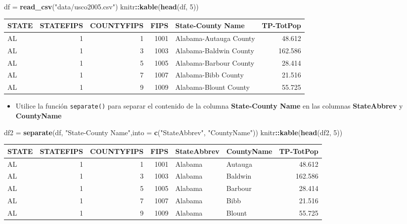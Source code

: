 \documentclass[
]{book}
\newenvironment{Shaded}{\begin{snugshade}}{\end{snugshade}}
\newcommand{\AttributeTok}[1]{\textcolor[rgb]{0.13,0.29,0.53}{#1}}
\newcommand{\DecValTok}[1]{\textcolor[rgb]{0.00,0.00,0.81}{#1}}
\newcommand{\FunctionTok}[1]{\textcolor[rgb]{0.13,0.29,0.53}{\textbf{#1}}}
\newcommand{\NormalTok}[1]{#1}
\newcommand{\OtherTok}[1]{\textcolor[rgb]{0.56,0.35,0.01}{#1}}
\newcommand{\SpecialCharTok}[1]{\textcolor[rgb]{0.81,0.36,0.00}{\textbf{#1}}}
\newcommand{\StringTok}[1]{\textcolor[rgb]{0.31,0.60,0.02}{#1}}
\providecommand{\tightlist}{%
  \setlength{\itemsep}{0pt}\setlength{\parskip}{0pt}}
\begin{document}
\begin{Shaded}
\begin{Highlighting}[]
\NormalTok{df }\OtherTok{=} \FunctionTok{read\_csv}\NormalTok{(}\StringTok{"data/usco2005.csv"}\NormalTok{)}
\NormalTok{knitr}\SpecialCharTok{::}\FunctionTok{kable}\NormalTok{(}\FunctionTok{head}\NormalTok{(df, }\DecValTok{5}\NormalTok{))}
\end{Highlighting}
\end{Shaded}

\begin{tabular}{l|r|r|r|l|r}
\hline
STATE & STATEFIPS & COUNTYFIPS & FIPS & State-County Name & TP-TotPop\\
\hline
AL & 1 & 1 & 1001 & Alabama-Autauga County & 48.612\\
\hline
AL & 1 & 3 & 1003 & Alabama-Baldwin County & 162.586\\
\hline
AL & 1 & 5 & 1005 & Alabama-Barbour County & 28.414\\
\hline
AL & 1 & 7 & 1007 & Alabama-Bibb County & 21.516\\
\hline
AL & 1 & 9 & 1009 & Alabama-Blount County & 55.725\\
\hline
\end{tabular}

\begin{itemize}
\tightlist
\item
  Utilice la función \texttt{separate()} para separar el contenido de la columna \textbf{State-County Name} en las columnas \textbf{StateAbbrev} y \textbf{CountyName}
\end{itemize}

\begin{Shaded}
\begin{Highlighting}[]
\NormalTok{df2 }\OtherTok{=} \FunctionTok{separate}\NormalTok{(df, }\StringTok{"State{-}County Name"}\NormalTok{,}\AttributeTok{into =} \FunctionTok{c}\NormalTok{(}\StringTok{"StateAbbrev"}\NormalTok{, }\StringTok{"CountyName"}\NormalTok{))}
\NormalTok{knitr}\SpecialCharTok{::}\FunctionTok{kable}\NormalTok{(}\FunctionTok{head}\NormalTok{(df2, }\DecValTok{5}\NormalTok{))}
\end{Highlighting}
\end{Shaded}

\begin{tabular}{l|r|r|r|l|l|r}
\hline
STATE & STATEFIPS & COUNTYFIPS & FIPS & StateAbbrev & CountyName & TP-TotPop\\
\hline
AL & 1 & 1 & 1001 & Alabama & Autauga & 48.612\\
\hline
AL & 1 & 3 & 1003 & Alabama & Baldwin & 162.586\\
\hline
AL & 1 & 5 & 1005 & Alabama & Barbour & 28.414\\
\hline
AL & 1 & 7 & 1007 & Alabama & Bibb & 21.516\\
\hline
AL & 1 & 9 & 1009 & Alabama & Blount & 55.725\\
\hline
\end{tabular}
\end{document}
